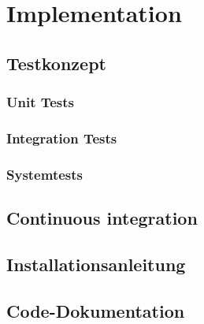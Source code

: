 \documentclass[11pt,ngerman]{article}
\begin{document}
    \section{Implementation}

    \subsection{Testkonzept}

    \subsubsection{Unit Tests}

    \subsubsection{Integration Tests}

    \subsubsection{Systemtests}

    \subsection{Continuous integration}

    \subsection{Installationsanleitung}

    \subsection{Code-Dokumentation}
\end{document}

